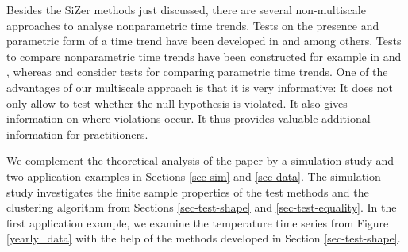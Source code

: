 Besides the SiZer methods just discussed, there are several non-multiscale approaches to analyse nonparametric time trends. Tests on the presence and parametric form of a time trend have been developed in \cite{Dette1999} and \cite{ZhangWu2011} among others. Tests to compare nonparametric time trends have been constructed for example in \cite{DegrasWu2012} and \cite{ChenWu2018}, whereas \cite{Vogelsang2005} and \cite{Lyubchich2016} consider tests for comparing parametric time trends. One of the advantages of our multiscale approach is that it is very informative: It does not only allow to test whether the null hypothesis is violated. It also gives information on where violations occur. 
It thus provides valuable additional information for practitioners. 




We complement the theoretical analysis of the paper by a simulation study and two application examples in Sections \ref{sec-sim} and \ref{sec-data}. The simulation study investigates the finite sample properties of the test methods and the clustering algorithm from Sections \ref{sec-test-shape} and \ref{sec-test-equality}. In the first application example, we examine the temperature time series from Figure \ref{yearly_data} with the help of the methods developed in Section \ref{sec-test-shape}.


